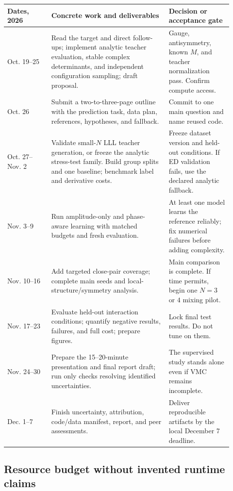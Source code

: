 \documentclass[11pt,letterpaper]{article}
\begin{document}
\begin{longtable}{>{\raggedright\arraybackslash}p{0.18\linewidth}>{\raggedright\arraybackslash}p{0.48\linewidth}>{\raggedright\arraybackslash}p{0.26\linewidth}}
\toprule
Dates, 2026 & Concrete work and deliverables & Decision or acceptance gate\\
\midrule\endhead
Oct. 19--25 & Read the target and direct follow-ups; implement analytic teacher evaluation, stable complex determinants, and independent configuration sampling; draft proposal. & Gauge, antisymmetry, known $M$, and teacher normalization pass. Confirm compute access.\\
Oct. 26 & Submit a two-to-three-page outline with the prediction task, data plan, references, hypotheses, and fallback. & Commit to one main question and name reused code.\\
Oct. 27--Nov. 2 & Validate small-$N$ LLL teacher generation, or freeze the analytic stress-test family. Build group splits and one baseline; benchmark label and derivative costs. & Freeze dataset version and held-out conditions. If ED validation fails, use the declared analytic fallback.\\
Nov. 3--9 & Run amplitude-only and phase-aware learning with matched budgets and fresh evaluation. & At least one model learns the reference reliably; fix numerical failures before adding complexity.\\
Nov. 10--16 & Add targeted close-pair coverage; complete main seeds and local-structure/symmetry analysis. & Main comparison is complete. If time permits, begin one $N=3$ or $4$ mixing pilot.\\
Nov. 17--23 & Evaluate held-out interaction conditions; quantify negative results, failures, and full cost; prepare figures. & Lock final test results. Do not tune on them.\\
Nov. 24--30 & Prepare the 15--20-minute presentation and final report draft; run only checks resolving identified uncertainties. & The supervised study stands alone even if VMC remains incomplete.\\
Dec. 1--7 & Finish uncertainty, attribution, code/data manifest, report, and peer assessments. & Deliver reproducible artifacts by the local December 7 deadline.\\
\bottomrule
\end{longtable}

\subsection{Resource budget without invented runtime claims}
\end{document}
